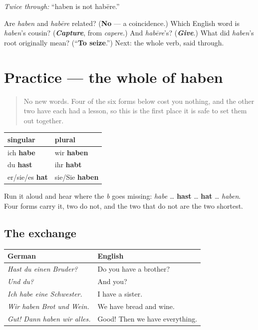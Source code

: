 \emph{Twice through:} \textquotedblleft{}haben is not habēre.\textquotedblright{}

\begin{tcolorbox}[breakable,colback=teal!4,colframe=teal!35!black,title={Before you move on}]
Are \emph{haben} and \emph{habēre} related? (\textbf{No} — a coincidence.) Which English word is \emph{haben}'s cousin? (\emph{\textbf{Capture}}, from \emph{capere}.) And \emph{habēre}'s? (\emph{\textbf{Give}}.) What did \emph{haben}'s root originally mean? (\textquotedblleft{}\textbf{To seize}.\textquotedblright{}) Next: the whole verb, said through.
\end{tcolorbox}
\section[Practice]{Practice — the whole of haben}

\label{lesson:GE-C14-practice}



\begin{quote}
No new words. Four of the six forms below cost you nothing, and the other two have each had a lesson, so this is the first place it is safe to set them out together.
\end{quote}

\begin{grammarlens}[title={Grammar Lens: the six, assembled}]
\noindent
\begin{tabularx}{\linewidth}{@{}>{\raggedright\arraybackslash}X>{\raggedright\arraybackslash}X@{}}
\toprule
\textbf{singular} & \textbf{plural} \\
\midrule
ich \textbf{habe} & wir \textbf{haben} \\
du \textbf{hast} & ihr \textbf{habt} \\
er/sie/es \textbf{hat} & sie/Sie \textbf{haben} \\
\bottomrule
\end{tabularx}

Run it aloud and hear where the \emph{b} goes missing: \emph{habe} … \textbf{hast} … \textbf{hat} … \emph{haben}. Four forms carry it, two do not, and the two that do not are the two shortest.
\end{grammarlens}

\subsection*{The exchange}
\noindent
\begin{tabularx}{\linewidth}{@{}>{\raggedright\arraybackslash}X>{\raggedright\arraybackslash}X@{}}
\toprule
\textbf{German} & \textbf{English} \\
\midrule
\emph{Hast du einen Bruder?} & Do you have a brother? \\
\emph{Und du?} & And you? \\
\emph{Ich habe eine Schwester.} & I have a sister. \\
\emph{Wir haben Brot und Wein.} & We have bread and wine. \\
\emph{Gut! Dann haben wir alles.} & Good! Then we have everything. \\
\bottomrule
\end{tabularx}

